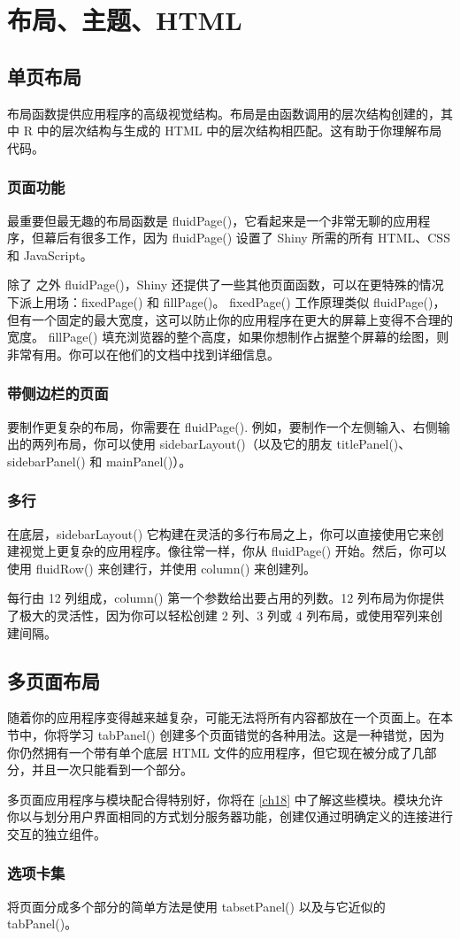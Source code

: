 \chapter{布局、主题、HTML\label{ch06}}
\section{单页布局}
布局函数提供应用程序的高级视觉结构。布局是由函数调用的层次结构创建的，其中 R 中的层次结构与生成的 HTML 中的层次结构相匹配。这有助于你理解布局代码。
\subsection{页面功能}
最重要但最无趣的布局函数是 fluidPage()，它看起来是一个非常无聊的应用程序，但幕后有很多工作，因为 fluidPage() 设置了 Shiny 所需的所有 HTML、CSS 和 JavaScript。

除了 之外 fluidPage()，Shiny 还提供了一些其他页面函数，可以在更特殊的情况下派上用场：fixedPage() 和 fillPage()。 fixedPage() 工作原理类似 fluidPage()，但有一个固定的最大宽度，这可以防止你的应用程序在更大的屏幕上变得不合理的宽度。 fillPage() 填充浏览器的整个高度，如果你想制作占据整个屏幕的绘图，则非常有用。你可以在他们的文档中找到详细信息。
\subsection{带侧边栏的页面}
要制作更复杂的布局，你需要在 fluidPage(). 例如，要制作一个左侧输入、右侧输出的两列布局，你可以使用 sidebarLayout()（以及它的朋友 titlePanel()、sidebarPanel() 和 mainPanel()）。


\subsection{多行}
在底层，sidebarLayout() 它构建在灵活的多行布局之上，你可以直接使用它来创建视觉上更复杂的应用程序。像往常一样，你从 fluidPage() 开始。然后，你可以使用 fluidRow() 来创建行，并使用 column() 来创建列。

每行由 12 列组成，column() 第一个参数给出要占用的列数。12 列布局为你提供了极大的灵活性，因为你可以轻松创建 2 列、3 列或 4 列布局，或使用窄列来创建间隔。
\section{多页面布局}
随着你的应用程序变得越来越复杂，可能无法将所有内容都放在一个页面上。在本节中，你将学习 tabPanel() 创建多个页面错觉的各种用法。这是一种错觉，因为你仍然拥有一个带有单个底层 HTML 文件的应用程序，但它现在被分成了几部分，并且一次只能看到一个部分。

多页面应用程序与模块配合得特别好，你将在 \autoref{ch18} 中了解这些模块。模块允许你以与划分用户界面相同的方式划分服务器功能，创建仅通过明确定义的连接进行交互的独立组件。
\subsection{选项卡集}
将页面分成多个部分的简单方法是使用 tabsetPanel() 以及与它近似的 tabPanel()。